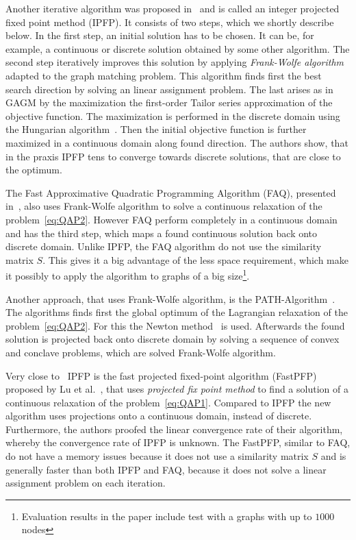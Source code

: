 Another iterative algorithm was proposed in~\cite{Leordeanu2009_IPFP} and is called an integer projected fixed point method (IPFP). It consists of two steps, which we shortly describe below. In the first step, an initial solution has to be chosen. It can be, for example, a continuous or discrete solution obtained by some other algorithm. The second step iteratively improves this solution by applying \emph{Frank-Wolfe algorithm}~\cite{Wolfe1956} adapted to the graph matching problem. This algorithm finds first the best search direction by solving an linear assignment problem. The last arises as in GAGM by the maximization the first-order Tailor series approximation of the objective function. The maximization is performed in the discrete domain using the Hungarian algorithm~\cite{Kuhn1955}. Then the initial objective function is further maximized in a continuous domain along found direction. The authors show, that in the praxis IPFP tens to converge towards discrete solutions, that are close to the optimum.

The Fast Approximative Quadratic Programming Algorithm (FAQ), presented in~\cite{Vogelstein_BrainGraphs}, also uses Frank-Wolfe algorithm to solve a continuous relaxation of the problem~\eqref{eq:QAP2}. However FAQ perform completely in a continuous domain and has the third step, which maps a found continuous solution back onto discrete domain. Unlike IPFP, the FAQ algorithm do not use the similarity matrix $S$. This gives it a big advantage of the less space requirement, which make it possibly to apply the algorithm to graphs of a big size\footnote{Evaluation results in the paper include test with a graphs with up to $1000$ nodes}. 

Another approach, that uses Frank-Wolfe algorithm, is the PATH-Algorithm~\cite{Zaslavskiy2010}. The algorithms finds first the global optimum of the Lagrangian relaxation of the problem~\eqref{eq:QAP2}. For this the Newton method~\cite{Book_ConvOpt} is used. Afterwards the found solution is projected back onto discrete domain by solving a sequence of convex and conclave problems, which are solved Frank-Wolfe algorithm.

Very close to~ IPFP is the fast projected fixed-point algorithm (FastPFP) proposed by Lu et al.~\cite{FastPFP}, that uses \emph{projected fix point method} to find a solution of a continuous relaxation of the problem~\eqref{eq:QAP1}. Compared to IPFP the new algorithm uses projections onto a continuous domain, instead of discrete. Furthermore, the authors proofed the linear convergence rate of their algorithm, whereby the convergence rate of IPFP is unknown. The FastPFP, similar to FAQ, do not have a memory issues because it does not use a similarity matrix $S$ and is generally faster than both IPFP and FAQ, because it does not solve a linear assignment problem on each iteration.

